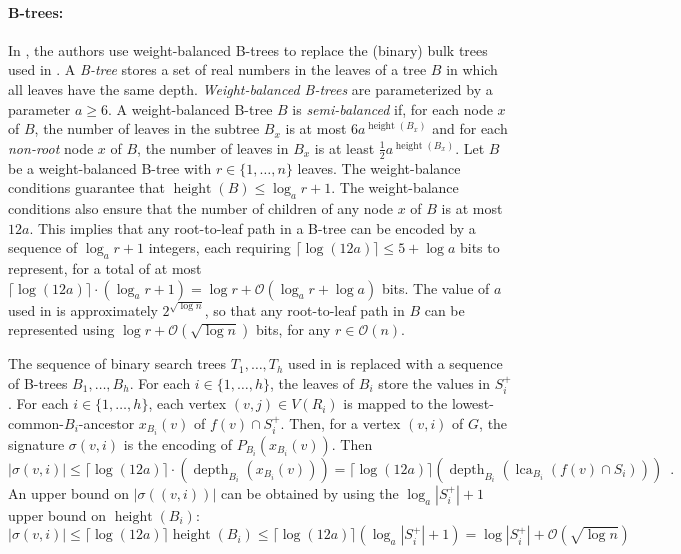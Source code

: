 \documentclass{patmorin}
\renewcommand{\ge}{\geqslant}
\renewcommand{\le}{\leqslant}
\newcommand{\defin}[1]{\emph{\textcolor{brightmaroon}{#1}}}
\DeclareMathOperator{\height}{height}
\DeclareMathOperator{\depth}{depth}
\DeclareMathOperator{\lca}{lca}
\newcommand{\Oh}{\mathcal{O}}
\begin{document}
  \paragraph{B-trees:}
  In \cite{gawrychowski.janczewski:simpler}, the authors use weight-balanced B-trees to replace the (binary) bulk trees used in \cite{dujmovic.esperet.ea:adjacency}.
  A \defin{B-tree} stores a set of real numbers in the leaves of a tree $B$ in which all leaves have the same depth.
  \defin{Weight-balanced B-trees} are parameterized by a parameter $a\ge 6$.  A weight-balanced B-tree $B$ is \defin{semi-balanced} if, for each node $x$ of $B$, the number of leaves in the subtree $B_x$ is at most $6a^{\height(B_x)}$ and for each \emph{non-root} node $x$ of $B$, the number of leaves in $B_x$ is at least $\tfrac{1}{2}a^{\height(B_x)}$.
  Let $B$ be a weight-balanced B-tree with $r\in \{1,\ldots,n\}$ leaves.  The weight-balance conditions guarantee that $\height(B)\le \log_a r + 1$.
  The weight-balance conditions also ensure that the number of children of any node $x$ of $B$ is at most $12a$.
  This implies that any root-to-leaf path in a B-tree can be encoded by a sequence of $\log_a r+1$ integers, each requiring $\lceil\log(12a)\rceil\le 5+\log a$ bits to represent, for a total of at most $\lceil\log(12a)\rceil\cdot(\log_a r+1)=\log r + \Oh(\log_a r + \log a)$ bits.
  The value of $a$ used in \cite{gawrychowski.janczewski:simpler} is approximately $2^{\sqrt{\log n}}$, so that any root-to-leaf path in $B$ can be represented using $\log r + \Oh(\sqrt{\log n})$ bits, for any $r\in\Oh(n)$.

  The sequence of binary search trees $T_1,\ldots,T_h$ used in \cite{gawrychowski.janczewski:simpler} is replaced with a sequence of B-trees $B_1,\ldots,B_h$.
  For each $i\in\{1,\ldots,h\}$, the leaves of $B_i$ store the values in $S^+_i$.
  For each $i\in\{1,\ldots,h\}$, each vertex $(v,j)\in V(R_i)$ is mapped to the lowest-common-$B_i$-ancestor $x_{B_i}(v)$ of $f(v)\cap S^+_i$.
  Then, for a vertex $(v,i)$ of $G$, the signature $\sigma(v,i)$ is the encoding of $P_{B_i}(x_{B_i}(v))$.
  Then
  \[
    |\sigma(v,i)| \le \lceil\log (12a)\rceil\cdot(\depth_{B_i}(x_{B_i}(v))) = \lceil\log (12a)\rceil(\depth_{B_i}(\lca_{B_i}(f(v)\cap S_i))) \enspace .
  \]
  An upper bound on $|\sigma((v,i))|$ can be obtained by using the $\log_a |S^+_i|+1$ upper bound on $\height(B_i)$:
  \[
    |\sigma(v,i)|\le \lceil\log (12a)\rceil\height(B_i) \le \lceil\log (12a)\rceil(\log_a |S^+_i| + 1)= \log |S^+_i| + \Oh(\sqrt{\log n})
  \]
\end{document}
